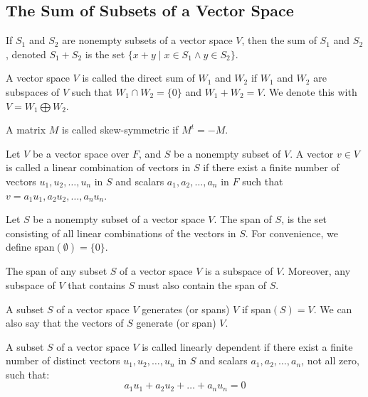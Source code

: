 \documentclass[nobib,notoc]{tufte-handout}
\begin{document}
\subsection{The Sum of Subsets of a Vector Space}
If \(S_1\) and \(S_2\) are nonempty subsets of a vector space \(V\), then the sum of \(S_1\) and \(S_2\), denoted \(S_1+S_2\) is the set \(\{x+y\mid x\in S_1\wedge y\in S_2\}\).
\begin{defi}
A vector space \(V\) is called the direct sum of \(W_1\) and \(W_2\) if \(W_1\) and \(W_2\) are subspaces of \(V\) such that \(W_{1}\cap W_{2}=\{0\}\) and \(W_{1}+W_{2}=V\). We denote this with \(V=W_{1}\bigoplus W_{2}\).
\end{defi}
\begin{defi}
A matrix \(M\) is called skew-symmetric if \(M^t=-M\).
\end{defi}
\begin{defi}
Let \(V\) be a vector space over \(F\), and \(S\) be a nonempty subset of \(V\). A vector \(v\in V\) is called a linear combination of vectors in \(S\) if there exist a finite number of vectors \(u_1, u_2,\ldots, u_n\) in \(S\) and scalars \(a_1,a_2,\ldots, a_n\) in \(F\) such that \(v=a_1u_1, a_2u_2, \ldots, a_nu_n\).
\end{defi}
\begin{defi}[Span]
	Let \(S\) be a nonempty subset of a vector space \(V\). The span of \(S\), is the set consisting of all linear combinations of the vectors in \(S\). For convenience, we define span\((\emptyset)=\{0\}\).
\end{defi}
\begin{thm}
The span of any subset \(S\) of a vector space \(V\) is a subspace of \(V\). Moreover, any subspace of \(V\) that contains \(S\) must also contain the span of \(S\).
\end{thm}
\begin{defi}[Generate]
	A subset \(S\) of a vector space \(V\) generates (or spans) \(V\) if span\((S)=V\). We can also say that the vectors of \(S\) generate (or span) \(V\).
\end{defi}
\begin{defi}
A subset \(S\) of a vector space \(V\) is called linearly dependent if there exist a finite number of distinct vectors \(u_1, u_2, \ldots, u_n\) in \(S\) and scalars \(a_1, a_2,\ldots, a_n\), not all zero, such that:
\begin{equation*}
	a_1u_1+a_2u_2+\ldots+a_nu_n=0
\end{equation*}
\end{defi}
\end{document}
